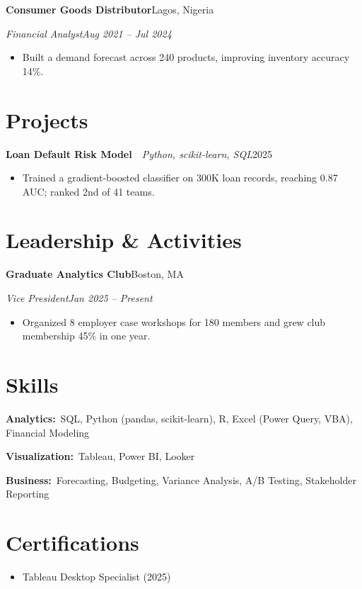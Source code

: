 \documentclass[letterpaper,11pt]{article}
\newcommand{\rRole}[4]{%
  \vspace{4pt}%
  \noindent\textbf{#2}\hfill#3\par
  \noindent\textit{#1}\hfill\textit{#4}\par
  \vspace{1pt}%
}
\newcommand{\rProject}[3]{%
  \vspace{4pt}%
  \noindent\textbf{#1}\ \textbar\ \textit{#2}\hfill#3\par
  \vspace{1pt}%
}
\newcommand{\rSkill}[2]{\noindent\textbf{#1:}\ #2\par\vspace{2pt}}
\newenvironment{rBullets}
  {\begin{itemize}[leftmargin=15pt,itemsep=1.5pt,parsep=0pt,topsep=3pt,
                   partopsep=0pt,label=\textbullet]}
  {\end{itemize}}
\begin{document}
\rRole{Financial Analyst}{Consumer Goods Distributor}{Lagos, Nigeria}{Aug 2021 -- Jul 2024}
\begin{rBullets}
  \item Built a demand forecast across 240 products, improving inventory accuracy 14\%.
\end{rBullets}

\section{Projects}

\rProject{Loan Default Risk Model}{Python, scikit-learn, SQL}{2025}
\begin{rBullets}
  \item Trained a gradient-boosted classifier on 300K loan records, reaching 0.87 AUC; ranked 2nd of 41 teams.
\end{rBullets}

\section{Leadership \& Activities}

\rRole{Vice President}{Graduate Analytics Club}{Boston, MA}{Jan 2025 -- Present}
\begin{rBullets}
  \item Organized 8 employer case workshops for 180 members and grew club membership 45\% in one year.
\end{rBullets}

\section{Skills}
\rSkill{Analytics}{SQL, Python (pandas, scikit-learn), R, Excel (Power Query, VBA), Financial Modeling}
\rSkill{Visualization}{Tableau, Power BI, Looker}
\rSkill{Business}{Forecasting, Budgeting, Variance Analysis, A/B Testing, Stakeholder Reporting}

\section{Certifications}
\begin{rBullets}
  \item Tableau Desktop Specialist (2025)
\end{rBullets}
\end{document}
